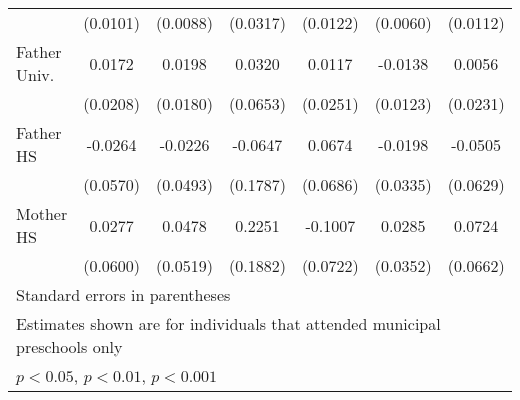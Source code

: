 \begin{table}[htbp]
\begin{tabular}{l*{6}{c}}
            &    (0.0101)         &    (0.0088)         &    (0.0317)         &    (0.0122)         &    (0.0060)         &    (0.0112)         \\
\addlinespace
Father Univ.&      0.0172         &      0.0198         &      0.0320         &      0.0117         &     -0.0138         &      0.0056         \\
            &    (0.0208)         &    (0.0180)         &    (0.0653)         &    (0.0251)         &    (0.0123)         &    (0.0231)         \\
\addlinespace
Father HS   &     -0.0264         &     -0.0226         &     -0.0647         &      0.0674         &     -0.0198         &     -0.0505         \\
            &    (0.0570)         &    (0.0493)         &    (0.1787)         &    (0.0686)         &    (0.0335)         &    (0.0629)         \\
\addlinespace
Mother HS   &      0.0277         &      0.0478         &      0.2251         &     -0.1007         &      0.0285         &      0.0724         \\
            &    (0.0600)         &    (0.0519)         &    (0.1882)         &    (0.0722)         &    (0.0352)         &    (0.0662)         \\
\bottomrule
\multicolumn{7}{l}{\footnotesize Standard errors in parentheses}\\
\multicolumn{7}{l}{\footnotesize Estimates shown are for individuals that attended municipal preschools only}\\
\multicolumn{7}{l}{\footnotesize \sym{*} \(p<0.05\), \sym{**} \(p<0.01\), \sym{***} \(p<0.001\)}\\
\end{tabular}
\end{table}
